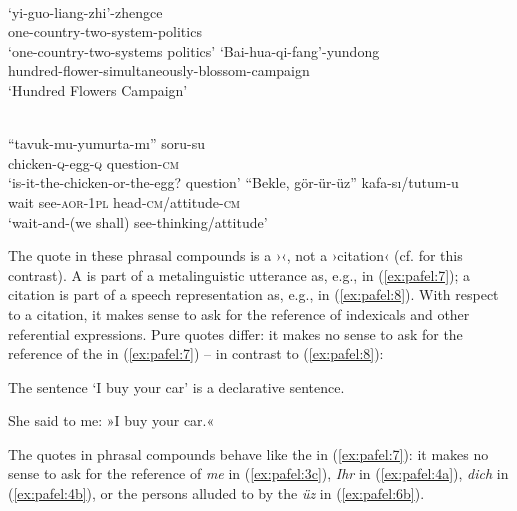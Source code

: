 \documentclass[output=paper]{LSP/langsci}
\begin{document}
\ea
      \\
      \ea\label{ex:pafel:5a}      
      \gll  `yi-guo-liang-zhi'-zhengce\\
            one-country-two-system-politics\\
      \glt  `one-country-two-systems politics'
      \ex\label{ex:pafel:5b}
      \gll   `Bai-hua-qi-fang'-yundong\\
             hundred-flower-simultaneously-blossom-campaign\\
      \glt  `Hundred Flowers Campaign'
    \z
\z         

\ea
      \\
      \ea\label{ex:pafel:6a}      
      \gll  “tavuk-mu-yumurta-mı” soru-su \\
            chicken-\textsc{q}-egg-\textsc{q} question-\textsc{cm}\\
      \glt  ‘is-it-the-chicken-or-the-egg? question'
      \ex\label{ex:pafel:6b}
      \gll   “Bekle, gör-ür-üz” kafa-sı/tutum-u\\
             wait see-\textsc{aor}-1\textsc{pl} head-\textsc{cm}/attitude-\textsc{cm}\\
      \glt  ‘wait-and-(we shall) see-thinking/attitude’
    \z
\z     

The quote in these phrasal compounds is a ›‹, not a ›citation‹ (cf. \citealt{Pafel2011} for this contrast). A  is part of a metalinguistic utterance as, e.g., in (\ref{ex:pafel:7}); a citation is part of a speech representation as, e.g., in (\ref{ex:pafel:8}). With respect to a citation, it makes sense to ask for the reference of indexicals and other referential expressions. Pure quotes differ: it makes no sense to ask for the reference of the  in (\ref{ex:pafel:7}) – in contrast to (\ref{ex:pafel:8}):

\ea\label{ex:pafel:7}
      The sentence `I buy your car' is a declarative sentence. \\
\z
 
\ea\label{ex:pafel:8}
      She said to me: »I buy your car.« \\
\z 

The quotes in phrasal compounds behave like the  in (\ref{ex:pafel:7}): it makes no sense to ask for the reference of \textit{me} in (\ref{ex:pafel:3c}), \textit{Ihr} in (\ref{ex:pafel:4a}), \textit{dich} in (\ref{ex:pafel:4b}), or the persons alluded to by the  \textit{üz} in (\ref{ex:pafel:6b}).
\end{document}

